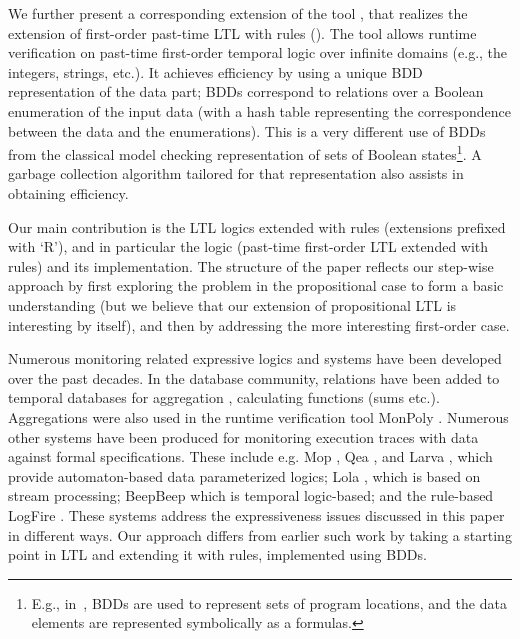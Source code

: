 \iffalse
A past-time property has the quality
that given a finite prefix of the execution, it is known whether the property
is violated or not; this in contrast to future time properties.
Consistent with that, we provide runtime verification algorithms for the past-time versions of the rule-based extensions of propositional and first-order LTL. 
\fi
%
We further present a corresponding extension of the 
\dejavu{} tool
\cite{HPU,HPU-FMSD,HP}, that realizes the extension 
of first-order past-time LTL with rules (\EPFLTL). The \dejavu{} tool allows runtime 
verification on past-time first-order temporal logic over infinite domains (e.g., the 
integers, strings, etc.). It achieves efficiency by using a unique BDD representation of the data part; BDDs correspond to relations over a Boolean enumeration of the
input data (with a hash table representing the
correspondence between the data and the enumerations). This is a very different
use of BDDs from the classical model checking representation of sets of Boolean states\footnote{E.g., in~\cite{Green-berg},
BDDs are used to represent sets of program locations,
and the data
elements are represented
symbolically as a formulas.}.
A garbage collection algorithm tailored for that representation
also assists in obtaining efficiency.

Our main contribution is the LTL logics extended with rules (extensions prefixed with `R'), and in particular the
logic \EPFLTL{} (past-time first-order LTL extended with rules) and its implementation.
 The structure of the paper reflects our 
step-wise approach by 
first exploring the problem in the propositional case to form a basic understanding (but we believe that
our extension of propositional LTL is
interesting by itself), and then by addressing the more interesting first-order case. 

Numerous monitoring related expressive logics and systems have been developed over 
the past decades.
In the database community, relations have been added to temporal 
databases for aggregation \cite{Libkin}, calculating functions (sums etc.). 
Aggregations were also used in the runtime verification tool {\sc MonPoly}
\cite{agrebasin}.   
Numerous other systems have been produced for monitoring execution traces with data 
against formal specifications. 
These include e.g. {\sc Mop} \cite{Meredith2011}, {\sc Qea} \cite{Reger2015}, and {\sc Larva} \cite{larva}, which
provide automaton-based data parameterized logics; {\sc Lola}
\cite{LOLA}, which is based on stream processing; {\sc BeepBeep} 
\cite{halle-beepbeep-ieee-12} which is temporal logic-based; and the 
rule-based {\sc LogFire} \cite{havelund-logfire-sttt14}. These systems address the
expressiveness issues discussed in this paper in different ways. Our approach differs
from earlier such work by taking a starting point in LTL and
extending it with rules, implemented using BDDs.


